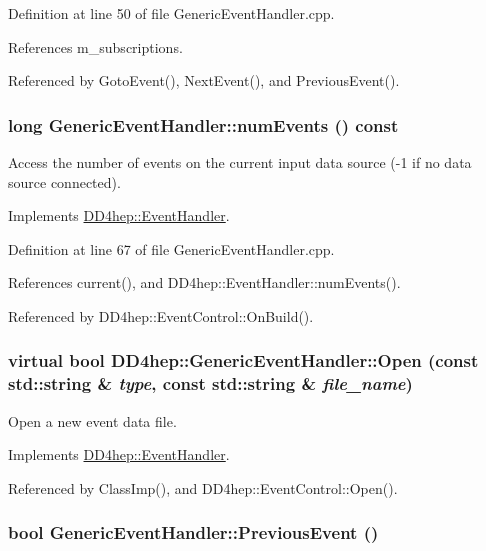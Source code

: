 Definition at line 50 of file GenericEventHandler.cpp.

References m\_\-subscriptions.

Referenced by GotoEvent(), NextEvent(), and PreviousEvent().\hypertarget{class_d_d4hep_1_1_generic_event_handler_a48f6771f5f90bd353e7b242f247a91cb}{
\subsubsection[{numEvents}]{\setlength{\rightskip}{0pt plus 5cm}long GenericEventHandler::numEvents () const}}
\label{class_d_d4hep_1_1_generic_event_handler_a48f6771f5f90bd353e7b242f247a91cb}


Access the number of events on the current input data source (-\/1 if no data source connected). 

Implements \hyperlink{class_d_d4hep_1_1_event_handler_a005436bba029439b513645485e3c0ff5}{DD4hep::EventHandler}.

Definition at line 67 of file GenericEventHandler.cpp.

References current(), and DD4hep::EventHandler::numEvents().

Referenced by DD4hep::EventControl::OnBuild().\hypertarget{class_d_d4hep_1_1_generic_event_handler_a2ad81c03ef6feac9bf399ccd5928da41}{
\subsubsection[{Open}]{\setlength{\rightskip}{0pt plus 5cm}virtual bool DD4hep::GenericEventHandler::Open (const std::string \& {\em type}, \/  const std::string \& {\em file\_\-name})}}
\label{class_d_d4hep_1_1_generic_event_handler_a2ad81c03ef6feac9bf399ccd5928da41}


Open a new event data file. 

Implements \hyperlink{class_d_d4hep_1_1_event_handler_a90995d3b610beee9d9f7fafcc060626b}{DD4hep::EventHandler}.

Referenced by ClassImp(), and DD4hep::EventControl::Open().\hypertarget{class_d_d4hep_1_1_generic_event_handler_a4b833d9537c7c29b0bfb0d567f98d0a3}{
\subsubsection[{PreviousEvent}]{\setlength{\rightskip}{0pt plus 5cm}bool GenericEventHandler::PreviousEvent ()}}
\label{class_d_d4hep_1_1_generic_event_handler_a4b833d9537c7c29b0bfb0d567f98d0a3}


